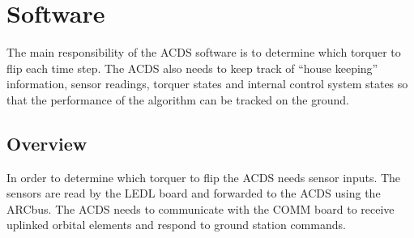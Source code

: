 
\chapter{Software}
\label{ch:Software}

The main responsibility of the \ac{ACDS} software is to determine which torquer to flip each time step. The \ac{ACDS} also needs to keep track of ``house keeping'' information, sensor readings, torquer states and internal control system states so that the performance of the algorithm can be tracked on the ground.

\section{Overview}

In order to determine which torquer to flip the \ac{ACDS} needs sensor inputs. The sensors are read by the \ac{LEDL} board and forwarded to the \ac{ACDS} using the \ac{ARC}bus. The \ac{ACDS} needs to communicate with the \ac{COMM} board to receive uplinked orbital elements and respond to ground station commands.

\begin{comment}
\begin{figure}[H]
    \centering
    \begin{tikzpicture}[node distance = 3cm, auto]
        \node [block] (AB) {\acs{ARC}bus interface};
        \node [block,right of=AB] (KF) {Kalman Filter};
        \node [block,above of=KF] (alg) {\acs{ACDS} algorithm};
        \node [block,above of=AB] (CMD) {\acs{ACDS} command parse};
        \node [block,right of=alg] (TQ) {Torquer Control and state tracking};
        \node [block,right of=KF] (HC) {House Keeping};
        \node [point,below of=KF] (DN)  {};

        \path [flow] (KF) -- (alg);
        \path [flow] (AB) -- (CMD);
        \path [flow] (alg) -- (TQ);
        \path [flow] (AB) -- (KF);

        \path [flow] (CMD) -- (KF);
        \path [flow] (CMD) -- (alg);

        \path [flow] (alg) -- (HC);
        \path [flow] (KF) -- (HC);
        \path [flow] (TQ) -- (HC);
        \path [flow] (HC) |- (DN);
        \path [flow] (DN) -| (AB);

    \end{tikzpicture}
    \caption{\acs{ACDS} software overview}
\end{figure}
\end{comment}

